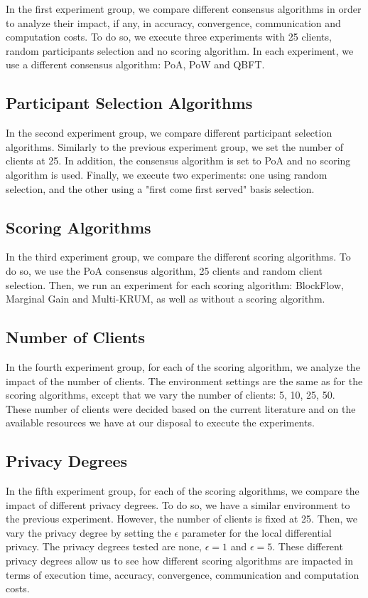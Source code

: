 In the first experiment group, we compare different consensus algorithms in order to analyze their impact, if any, in accuracy, convergence, communication and computation costs. To do so, we execute three experiments with 25 clients, random participants selection and no scoring algorithm. In each experiment, we use a different consensus algorithm: PoA, PoW and QBFT.

\subsection{Participant Selection Algorithms}

In the second experiment group, we compare different participant selection algorithms. Similarly to the previous experiment group, we set the number of clients at 25. In addition, the consensus algorithm is set to PoA and no scoring algorithm is used. Finally, we execute two experiments: one using random selection, and the other using a "first come first served" basis selection.

\subsection{Scoring Algorithms}

In the third experiment group, we compare the different scoring algorithms. To do so, we use the PoA consensus algorithm, 25 clients and random client selection. Then, we run an experiment for each scoring algorithm: BlockFlow, Marginal Gain and Multi-KRUM, as well as without a scoring algorithm.

\subsection{Number of Clients}

In the fourth experiment group, for each of the scoring algorithm, we analyze the impact of the number of clients. The environment settings are the same as for the scoring algorithms, except that we vary the number of clients: 5, 10, 25, 50. These number of clients were decided based on the current literature and on the available resources we have at our disposal to execute the experiments.

\subsection{Privacy Degrees}

In the fifth experiment group, for each of the scoring algorithms, we compare the impact of different privacy degrees. To do so, we have a similar environment to the previous experiment. However, the number of clients is fixed at 25. Then, we vary the privacy degree by setting the $\epsilon$ parameter for the local differential privacy. The privacy degrees tested are none, $\epsilon = 1$ and $\epsilon = 5$. These different privacy degrees allow us to see how different scoring algorithms are impacted in terms of execution time, accuracy, convergence, communication and computation costs.

